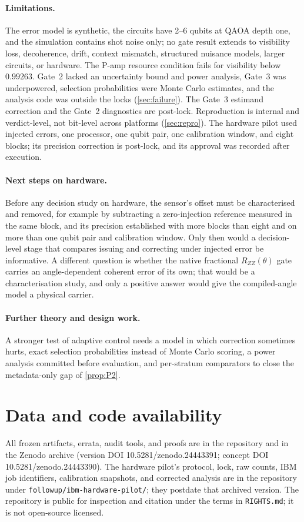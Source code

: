 \documentclass[10pt,twocolumn]{article}
\theoremstyle{definition}
\theoremstyle{remark}
\begin{document}
\paragraph{Limitations.} The error model is synthetic, the circuits have 2--6 qubits at QAOA depth one, and the simulation contains shot noise only; no gate result extends to visibility loss, decoherence, drift, context mismatch, structured nuisance models, larger circuits, or hardware. The P-amp resource condition fails for visibility below $0.99263$. Gate~2 lacked an uncertainty bound and power analysis, Gate~3 was underpowered, selection probabilities were Monte Carlo estimates, and the analysis code was outside the locks (\cref{sec:failure}). The Gate~3 estimand correction and the Gate~2 diagnostics are post-lock. Reproduction is internal and verdict-level, not bit-level across platforms (\cref{sec:repro}). The hardware pilot used injected errors, one processor, one qubit pair, one calibration window, and eight blocks; its precision correction is post-lock, and its approval was recorded after execution.

\paragraph{Next steps on hardware.} Before any decision study on hardware, the sensor's offset must be characterised and removed, for example by subtracting a zero-injection reference measured in the same block, and its precision established with more blocks than eight and on more than one qubit pair and calibration window. Only then would a decision-level stage that compares issuing and correcting under injected error be informative. A different question is whether the native fractional $R_{ZZ}(\theta)$ gate carries an angle-dependent coherent error of its own; that would be a characterisation study, and only a positive answer would give the compiled-angle model a physical carrier.

\paragraph{Further theory and design work.} A stronger test of adaptive control needs a model in which correction sometimes hurts, exact selection probabilities instead of Monte Carlo scoring, a power analysis committed before evaluation, and per-stratum comparators to close the metadata-only gap of \cref{prop:P2}.

\section*{Data and code availability}
All frozen artifacts, errata, audit tools, and proofs are in the repository and in the Zenodo archive (version DOI 10.5281/zenodo.24443391; concept DOI 10.5281/zenodo.24443390). The hardware pilot's protocol, lock, raw counts, IBM job identifiers, calibration snapshots, and corrected analysis are in the repository under \texttt{followup/ibm-hardware-pilot/}; they postdate that archived version. The repository is public for inspection and citation under the terms in \texttt{RIGHTS.md}; it is not open-source licensed.
\end{document}
